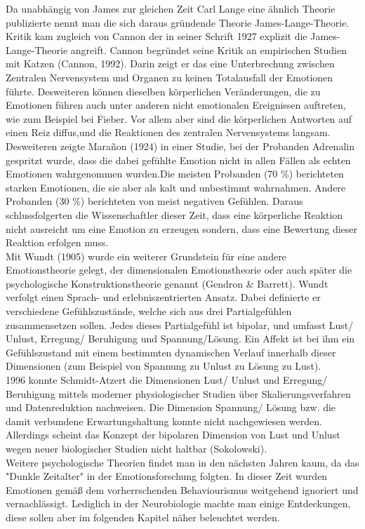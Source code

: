 Da unabhängig von James zur gleichen Zeit Carl Lange eine ähnlich Theorie publizierte nennt man die sich daraus gründende Theorie James-Lange-Theorie.\\
Kritik kam zugleich von Cannon der in seiner Schrift 1927 explizit die James-Lange-Theorie angreift. Cannon begründet seine Kritik an empirischen Studien mit Katzen (Cannon, 1992). Darin zeigt er das eine Unterbrechung zwischen Zentralen Nervensystem und Organen zu keinen Totalausfall der Emotionen führte. Desweiteren können dieselben körperlichen Veränderungen, die zu Emotionen führen auch unter anderen nicht emotionalen Ereignissen auftreten, wie zum Beispiel bei Fieber. Vor allem aber sind die körperlichen Antworten auf einen Reiz diffus,und die Reaktionen des zentralen Nervensystems langsam. Desweiteren zeigte Marañon 
(1924) in einer Studie, bei der Probanden Adrenalin gespritzt wurde, dass die dabei gefühlte Emotion nicht in allen Fällen als echten Emotionen wahrgenommen wurden.Die meisten Probanden (70 \%) berichteten starken Emotionen, die sie aber als kalt und unbestimmt wahrnahmen.  Andere Probanden (30 \%) berichteten von meist negativen Gefühlen. Daraus schlussfolgerten die Wissenschaftler dieser Zeit, dass eine körperliche Reaktion nicht ausreicht um eine Emotion zu erzeugen sondern, dass eine Bewertung dieser Reaktion erfolgen muss.\\
Mit Wundt (1905) wurde ein weiterer Grundstein für eine andere Emotionstheorie gelegt, der dimensionalen Emotionstheorie oder auch später die psychologische Konstruktionstheorie genannt (Gendron \& Barrett). Wundt verfolgt einen Sprach- und erlebniszentrierten Ansatz.
Dabei definierte er verschiedene Gefühlszustände, welche sich aus drei Partialgefühlen zusammensetzen sollen. Jedes dieses Partialgefühl ist bipolar, und umfasst Lust/ Unlust, Erregung/ Beruhigung und Spannung/Lösung. Ein Affekt ist bei ihm ein Gefühlszustand mit einem bestimmten dynamischen Verlauf innerhalb dieser Dimensionen (zum Beispiel von Spannung zu Unlust zu Lösung zu Lust).\\
1996 konnte Schmidt-Atzert die Dimensionen Lust/ Unlust und Erregung/ Beruhigung mittels moderner physiologischer Studien über Skalierungsverfahren und Datenreduktion nachweisen. Die Dimension Spannung/ Lösung bzw. die damit verbundene Erwartungshaltung konnte nicht nachgewiesen werden. Allerdings scheint das Konzept der bipolaren Dimension von Lust und Unlust wegen neuer biologischer Studien nicht haltbar (Sokolowski).\\
Weitere psychologische Theorien findet man in den nächsten Jahren kaum, da das "Dunkle Zeitalter" in der Emotionsforschung folgten. In dieser Zeit wurden Emotionen gemäß dem vorherrschenden Behaviourismus weitgehend ignoriert und vernachlässigt. Lediglich in der Neurobiologie machte man einige Entdeckungen, diese sollen aber im folgenden Kapitel näher beleuchtet werden.\\
